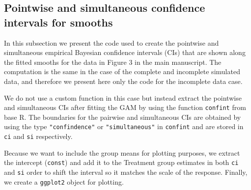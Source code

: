 \documentclass[
]{article}
\newcommand{\passthrough}[1]{#1}
\begin{document}
\hypertarget{pointwise-and-simultaneous-confidence-intervals-for-smooths}{%
\subsection{Pointwise and simultaneous confidence intervals for smooths}\label{pointwise-and-simultaneous-confidence-intervals-for-smooths}}

In this subsection we present the code used to create the pointwise and simultaneous empirical Bayesian confidence intervals (CIs) that are shown along the fitted smooths for the data in Figure 3 in the main manuscript. The computation is the same in the case of the complete and incomplete simulated data, and therefore we present here only the code for the incomplete data case.

We do not use a custom function in this case but instead extract the pointwise and simultaneous CIs after fitting the GAM by using the function \passthrough{\lstinline!confint!} from base R. The boundaries for the pairwise and simultaneous CIs are obtained by using the type \passthrough{\lstinline!"confindence"!} or \passthrough{\lstinline!"simultaneous"!} in \passthrough{\lstinline!confint!} and are stored in \passthrough{\lstinline!ci!} and \passthrough{\lstinline!si!} respectively.

Because we want to include the group means for plotting purposes, we extract the intercept (\passthrough{\lstinline!const!}) and add it to the Treatment group estimates in both \passthrough{\lstinline!ci!} and \passthrough{\lstinline!si!} order to shift the interval so it matches the scale of the response. Finally, we create a \passthrough{\lstinline!ggplot2!} object for plotting.
\end{document}
